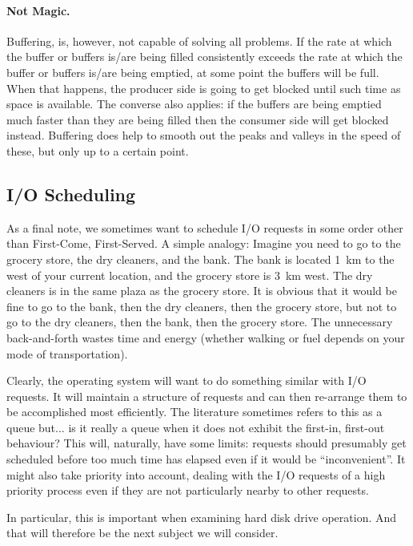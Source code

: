 \paragraph{Not Magic.}
Buffering, is, however, not capable of solving all problems. If the rate at which the buffer or buffers is/are being filled consistently exceeds the rate at which the  buffer or buffers is/are being emptied, at some point the buffers will be full. When that happens, the producer side is going to get blocked until such time as space is available. The converse also applies: if the buffers are being emptied much faster than they are being filled then the consumer side will get blocked instead. Buffering does help to smooth out the peaks and valleys in the speed of these, but only up to a certain point.


\subsection*{I/O Scheduling}

As a final note, we sometimes want to schedule I/O requests in some order other than First-Come, First-Served. A simple analogy: Imagine you need to go to the grocery store, the dry cleaners, and the bank. The bank is located 1~km to the west of your current location, and the grocery store is 3~km west. The dry cleaners is in the same plaza as the grocery store. It is obvious that it would be fine to go to the bank, then the dry cleaners, then the grocery store, but not to go to the dry cleaners, then the bank, then the grocery store. The unnecessary back-and-forth wastes time and energy (whether walking or fuel depends on your mode of transportation).

Clearly, the operating system will want to do something similar with I/O requests. It will maintain a structure of requests and can then re-arrange them to be accomplished most efficiently. The literature sometimes refers to this as a queue but... is it really a queue when it does not exhibit the first-in, first-out behaviour? This will, naturally, have some limits: requests should presumably get scheduled before too much time has elapsed even if it would be ``inconvenient''. It might also take priority into account, dealing with the I/O requests of a high priority process even if they are not particularly nearby to other requests. 

In particular, this is important when examining hard disk drive operation. And that will therefore be the next subject we will consider.


